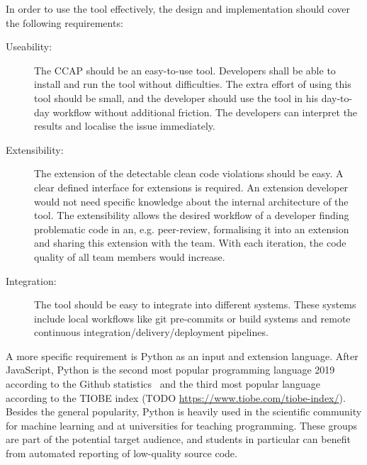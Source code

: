 In order to use the tool effectively, the design and implementation should cover the following requirements:
\begin{description}
    \item[Useability:]  The CCAP should be an easy-to-use tool. Developers shall be able to install and run the tool without difficulties. The extra effort of using this tool should be small, and the developer should use the tool in his day-to-day workflow without additional friction. The developers can interpret the results and localise the issue immediately.
    \item[Extensibility:] The extension of the detectable clean code violations should be easy. A clear defined interface for extensions is required. An extension developer would not need specific knowledge about the internal architecture of the tool. The extensibility allows the desired workflow of a developer finding problematic code in an, e.g. peer-review, formalising it into an extension and sharing this extension with the team. With each iteration, the code quality of all team members would increase.
    \item[Integration:] The tool should be easy to integrate into different systems. These systems include local workflows like git pre-commits or build systems and remote continuous integration/delivery/deployment pipelines.
\end{description}
A more specific requirement is Python as an input and extension language. After JavaScript, Python is the second most popular programming language 2019 according to the Github statistics~\cite{github_inc_state_2019} and the third most popular language according to the TIOBE index (TODO \url{https://www.tiobe.com/tiobe-index/}). Besides the general popularity, Python is heavily used in the scientific community for machine learning and at universities for teaching programming. These groups are part of the potential target audience, and students in particular can benefit from automated reporting of low-quality source code.

